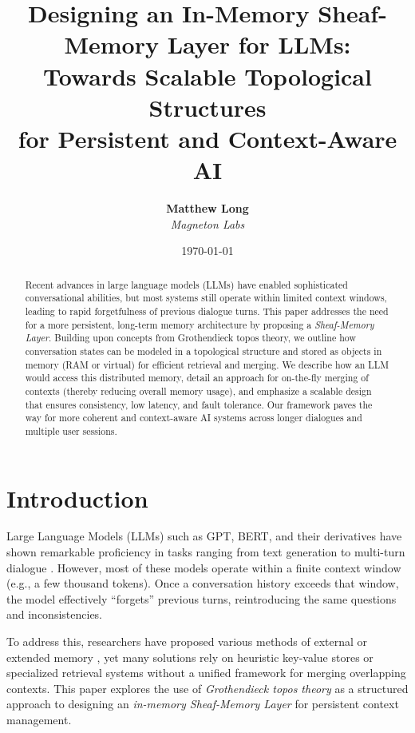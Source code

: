 \documentclass{article}
\title{%
Designing an In-Memory Sheaf-Memory Layer for LLMs: \\
Towards Scalable Topological Structures \\
for Persistent and Context-Aware AI
}
\author{%
\textbf{Matthew Long} \\
\textit{Magneton Labs} \\
}
\date{\today}
\begin{document}
\maketitle

\begin{abstract}
Recent advances in large language models (LLMs) have enabled sophisticated conversational abilities, but most systems still operate within limited context windows, leading to rapid forgetfulness of previous dialogue turns. This paper addresses the need for a more persistent, long-term memory architecture by proposing a \emph{Sheaf-Memory Layer}. Building upon concepts from Grothendieck topos theory, we outline how conversation states can be modeled in a topological structure and stored as objects in memory (RAM or virtual) for efficient retrieval and merging. We describe how an LLM would access this distributed memory, detail an approach for on-the-fly merging of contexts (thereby reducing overall memory usage), and emphasize a scalable design that ensures consistency, low latency, and fault tolerance. Our framework paves the way for more coherent and context-aware AI systems across longer dialogues and multiple user sessions.
\end{abstract}

\tableofcontents

\section{Introduction}
\label{sec:intro}

Large Language Models (LLMs) such as GPT, BERT, and their derivatives have shown remarkable proficiency in tasks ranging from text generation to multi-turn dialogue \citep{vaswani2017attention, devlin2019bert, brown2020language}. However, most of these models operate within a finite context window (e.g., a few thousand tokens). Once a conversation history exceeds that window, the model effectively ``forgets'' previous turns, reintroducing the same questions and inconsistencies.

To address this, researchers have proposed various methods of external or extended memory \citep{weston2014memory, sukhbaatar2015end, lewis2020retrieval}, yet many solutions rely on heuristic key-value stores or specialized retrieval systems without a unified framework for merging overlapping contexts. This paper explores the use of \emph{Grothendieck topos theory} as a structured approach to designing an \emph{in-memory Sheaf-Memory Layer} for persistent context management. 
\end{document}
